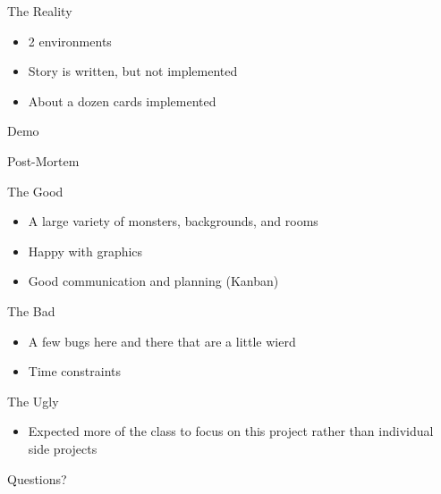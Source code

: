 \documentclass{../teamepsilon}
\begin{document}
\begin{frame}{The Reality}
    \begin{itemize}
         \item 2 environments
         \item Story is written, but not implemented
         \item About a dozen cards implemented
    \end{itemize}
\end{frame}

\begin{frame}[standout]
    \Huge
    Demo
\end{frame}

\begin{frame}[standout]
    \Huge
    Post-Mortem
\end{frame}

\begin{frame}{The Good}
    \begin{itemize}
        \item A large variety of monsters, backgrounds, and rooms
        \item Happy with graphics
        \item Good communication and planning (Kanban)
    \end{itemize}
\end{frame}

\begin{frame}{The Bad}
    \begin{itemize}
        \item A few bugs here and there that are a little wierd
        \item Time constraints
    \end{itemize}
\end{frame}

\begin{frame}{The Ugly}
    \begin{itemize}
        \item Expected more of the class to focus on this project rather than
              individual side projects
    \end{itemize}
\end{frame}

\begin{frame}[standout]
    \Huge
    Questions?
\end{frame}
\end{document}
